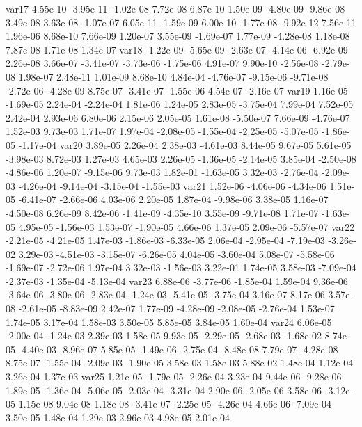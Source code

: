 var17  4.55e-10 -3.95e-11 -1.02e-08  7.72e-08  6.87e-10  1.50e-09 -4.80e-09 -9.86e-08  3.49e-08  3.63e-08 -1.07e-07  6.05e-11 -1.59e-09  6.00e-10 -1.77e-08 -9.92e-12  7.56e-11  1.96e-06  8.68e-10  7.66e-09  1.20e-07  3.55e-09 -1.69e-07  1.77e-09 -4.28e-08  1.18e-08  7.87e-08  1.71e-08  1.34e-07
var18 -1.22e-09 -5.65e-09 -2.63e-07 -4.14e-06 -6.92e-09  2.26e-08  3.66e-07 -3.41e-07 -3.73e-06 -1.75e-06  4.91e-07  9.90e-10 -2.56e-08 -2.79e-08  1.98e-07  2.48e-11  1.01e-09  8.68e-10  4.84e-04 -4.76e-07 -9.15e-06 -9.71e-08 -2.72e-06 -4.28e-09  8.75e-07 -3.41e-07 -1.55e-06  4.54e-07 -2.16e-07
var19  1.16e-05 -1.69e-05  2.24e-04 -2.24e-04  1.81e-06  1.24e-05  2.83e-05 -3.75e-04  7.99e-04  7.52e-05  2.42e-04  2.93e-06  6.80e-06  2.15e-06  2.05e-05  1.61e-08 -5.50e-07  7.66e-09 -4.76e-07  1.52e-03  9.73e-03  1.71e-07  1.97e-04 -2.08e-05 -1.55e-04 -2.25e-05 -5.07e-05 -1.86e-05 -1.17e-04
var20  3.89e-05  2.26e-04  2.38e-03 -4.61e-03  8.44e-05  9.67e-05  5.61e-05 -3.98e-03  8.72e-03  1.27e-03  4.65e-03  2.26e-05 -1.36e-05 -2.14e-05  3.85e-04 -2.50e-08 -4.86e-06  1.20e-07 -9.15e-06  9.73e-03  1.82e-01 -1.63e-05  3.32e-03 -2.76e-04 -2.09e-03 -4.26e-04 -9.14e-04 -3.15e-04 -1.55e-03
var21  1.52e-06 -4.06e-06 -4.34e-06  1.51e-05 -6.41e-07 -2.66e-06  4.03e-06  2.20e-05  1.87e-04 -9.98e-06  3.38e-05  1.16e-07 -4.50e-08  6.26e-09  8.42e-06 -1.41e-09 -4.35e-10  3.55e-09 -9.71e-08  1.71e-07 -1.63e-05  4.95e-05 -1.56e-03  1.53e-07 -1.90e-05  4.66e-06  1.37e-05  2.09e-06 -5.57e-07
var22 -2.21e-05 -4.21e-05  1.47e-03 -1.86e-03 -6.33e-05  2.06e-04 -2.95e-04 -7.19e-03 -3.26e-02  3.29e-03 -4.51e-03 -3.15e-07 -6.26e-05  4.04e-05 -3.60e-04  5.08e-07 -5.58e-06 -1.69e-07 -2.72e-06  1.97e-04  3.32e-03 -1.56e-03  3.22e-01  1.74e-05  3.58e-03 -7.09e-04 -2.37e-03 -1.35e-04 -5.13e-04
var23  6.88e-06 -3.77e-06 -1.85e-04  1.59e-04  9.36e-06 -3.64e-06 -3.80e-06 -2.83e-04 -1.24e-03 -5.41e-05 -3.75e-04  3.16e-07  8.17e-06  3.57e-08 -2.61e-05 -8.83e-09  2.42e-07  1.77e-09 -4.28e-09 -2.08e-05 -2.76e-04  1.53e-07  1.74e-05  3.17e-04  1.58e-03  3.50e-05  5.85e-05  3.84e-05  1.60e-04
var24  6.06e-05 -2.00e-04 -1.24e-03  2.39e-03  1.58e-05  9.93e-05 -2.29e-05 -2.68e-03 -1.68e-02  8.74e-05 -4.40e-03 -8.96e-07  5.85e-05 -1.49e-06 -2.75e-04 -8.48e-08  7.79e-07 -4.28e-08  8.75e-07 -1.55e-04 -2.09e-03 -1.90e-05  3.58e-03  1.58e-03  5.88e-02  1.48e-04  1.12e-04  3.26e-04  1.37e-03
var25  1.21e-05 -1.79e-05 -2.26e-04  3.23e-04  9.44e-06 -9.28e-06  1.89e-05 -1.36e-04 -5.06e-05 -2.03e-04 -3.31e-04  2.90e-06 -2.05e-06  3.58e-06 -3.12e-05  1.15e-08  9.04e-08  1.18e-08 -3.41e-07 -2.25e-05 -4.26e-04  4.66e-06 -7.09e-04  3.50e-05  1.48e-04  1.29e-03  2.96e-03  4.98e-05  2.01e-04

